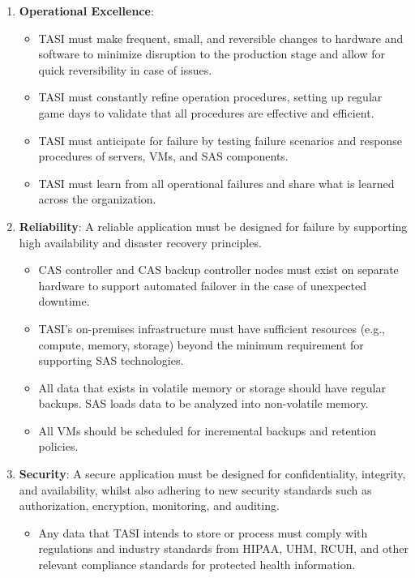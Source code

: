 \begin{enumerate}
    \item \textbf{\textcolor{Tue-link}{Operational Excellence}}:
    \begin{itemize}
        \item TASI must make frequent, small, and reversible changes to hardware and software to minimize disruption to the production stage and allow for quick reversibility in case of issues.
        \item TASI must constantly refine operation procedures, setting up regular game days to validate that all procedures are effective and efficient. 
        \item TASI must anticipate for failure by testing failure scenarios and response procedures of servers, VMs, and SAS components.
        \item TASI must learn from all operational failures and share what is learned across the organization.
    \end{itemize}
    \item \textbf{\textcolor{Tue-link}{Reliability}}: A reliable application must be designed for failure by supporting high availability and disaster recovery principles. 
    \begin{itemize}
        \item CAS controller and CAS backup controller nodes must exist on separate hardware to support automated failover in the case of unexpected downtime. 
        \item TASI's on-premises infrastructure must have sufficient resources (e.g., compute, memory, storage) beyond the minimum requirement for supporting SAS technologies.
        \item All data that exists in volatile memory or storage should have regular backups. SAS loads data to be analyzed into non-volatile memory.
        \item All VMs should be scheduled for incremental backups and retention policies. 
    \end{itemize}
    \item \textbf{\textcolor{Tue-link}{Security}}: A secure application must be designed for confidentiality, integrity, and availability, whilst also adhering to new security standards such as authorization, encryption, monitoring, and auditing.
    \begin{itemize}
        \item Any data that TASI intends to store or process must comply with regulations and industry standards from HIPAA, UHM, RCUH, and other relevant compliance standards for protected health information.

\end{itemize}
\end{enumerate}

